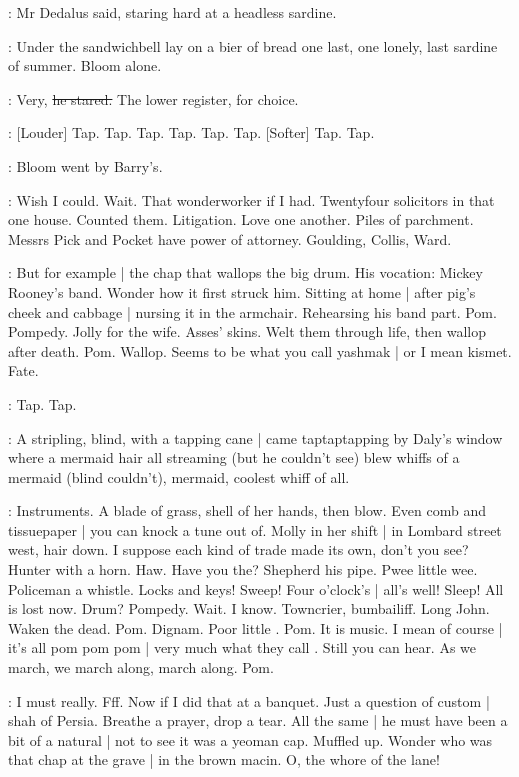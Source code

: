 :
Mr Dedalus said,
staring hard at a headless sardine.

:
Under the sandwichbell
lay on a bier of bread one last,
one lonely,
last sardine of summer.
Bloom alone.

\simon:
Very,
\sout{he stared.}
The lower register,
for choice.

\stripling:
[Louder] Tap.
Tap.
Tap.
Tap.
Tap.
Tap.
[Softer] Tap.
Tap.

:
Bloom went by Barry's.

\BloomInt:
Wish I could.
Wait.
That wonderworker if I had.
Twentyfour solicitors in that one house.
Counted them.
Litigation.
Love one another.
Piles of parchment.
Messrs Pick and Pocket have power of attorney.
Goulding,
Collis,
Ward.

\BloomInt:
But for example |
the chap that wallops the big drum.
His vocation:
Mickey Rooney's band.
Wonder how it first struck him.
Sitting at home |
after pig's cheek and cabbage |
nursing it in the armchair.
Rehearsing his band part.
Pom.
Pompedy.
Jolly for the wife.
Asses' skins.
Welt them through life,
then wallop after death.
Pom.
Wallop.
Seems to be what you call yashmak |
or I mean kismet.
Fate.

\stripling:
Tap.
Tap.

:
A stripling,
blind,
with a tapping cane |
came taptaptapping
by Daly's window where a mermaid hair all streaming
(but he couldn't see)
blew whiffs of a mermaid
(blind couldn't),
mermaid,
coolest whiff of all.

\BloomInt:
Instruments.
A blade of grass,
shell of her hands,
then blow.
Even comb and tissuepaper |
you can knock a tune out of.
Molly in her shift |
in Lombard street west,
hair down.
I suppose each kind of trade made its own,
don't you see?
Hunter with a horn.
Haw.
Have you the?
Shepherd his pipe.
Pwee little wee.
Policeman a whistle.
Locks and keys!
Sweep!
Four o'clock's |
all's well!
Sleep!
All is lost now.
Drum?
Pompedy.
Wait.
I know.
Towncrier,
bumbailiff.
Long John.
Waken the dead.
Pom.
Dignam.
Poor little .
Pom.
It is music.
I mean of course |
it's all pom pom pom |
very much what they call
.
Still you can hear.
As we march,
we march along,
march along.
Pom.

\BloomInt:
I must really.
Fff.
Now if I did that at a banquet.
Just a question of custom |
shah of Persia.
Breathe a prayer,
drop a tear.
All the same |
he must have been a bit of a natural |
not to see it was a yeoman cap.
Muffled up.
Wonder who was that chap at the grave |
in the brown macin.
O,
the whore of the lane!

